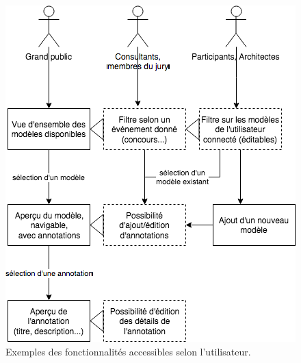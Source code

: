 \begin{figure}[ht]
    \centering
    \includegraphics[width=0.8\linewidth]{Figures/use-cases.png}
    \caption{Exemples des fonctionnalités accessibles selon l'utilisateur.}
    \label{fig:use-cases}
\end{figure}






